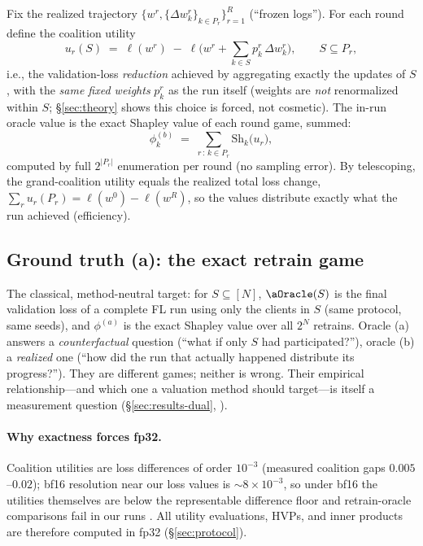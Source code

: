 Fix the realized trajectory $\{w^r, \{\Delta w_k^r\}_{k\in P_r}\}_{r=1}^R$
(``frozen logs''). For each round define the coalition utility
\begin{equation}
u_r(S) \;=\; \ell(w^r) \;-\; \ell\Big(w^r + \textstyle\sum_{k \in S} p_k^r\, \Delta w_k^r\Big),
\qquad S \subseteq P_r,
\label{eq:inrun-utility}
\end{equation}
i.e., the validation-loss \emph{reduction} achieved by aggregating exactly the
updates of $S$, with the \emph{same fixed weights} $p_k^r$ as the run itself
(weights are \emph{not} renormalized within $S$; \S\ref{sec:theory} shows this
choice is forced, not cosmetic). The in-run oracle value is the exact Shapley
value of each round game, summed:
\begin{equation}
\phi_k^{(b)} \;=\; \sum_{r\,:\,k \in P_r} \mathrm{Sh}_k\big(u_r\big),
\end{equation}
computed by full $2^{|P_r|}$ enumeration per round (no sampling error). By
telescoping, the grand-coalition utility equals the realized total loss change,
$\sum_r u_r(P_r) = \ell(w^0) - \ell(w^R)$, so the values distribute exactly what
the run achieved (efficiency).

\subsection{Ground truth (a): the exact retrain game}
\label{sec:oracle-a}

The classical, method-neutral target: for $S \subseteq [N]$,
$\aOracle(S)$ is the final validation loss of a complete FL run using only the
clients in $S$ (same protocol, same seeds), and $\phi^{(a)}$ is the exact Shapley
value over all $2^N$ retrains. Oracle (a) answers a \emph{counterfactual}
question (``what if only $S$ had participated?''), oracle (b) a \emph{realized}
one (``how did the run that actually happened distribute its progress?'').
They are different games; neither is wrong. Their empirical relationship---and
which one a valuation method should target---is itself a measurement question
(\S\ref{sec:results-dual}, ).

\paragraph{Why exactness forces fp32.}
Coalition utilities are loss differences of order $10^{-3}$ (measured
coalition gaps $0.005$--$0.02$); bf16 resolution near our loss values is
$\sim 8\times 10^{-3}$, so under bf16 the utilities themselves are below the
representable difference floor and retrain-oracle comparisons fail in our runs
. All utility
evaluations, HVPs, and inner products are therefore computed in fp32
(\S\ref{sec:protocol}).

